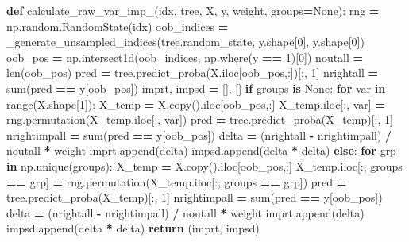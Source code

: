 \documentclass[
  11pt,
  oneside]{book}
\newenvironment{Shaded}{\begin{snugshade}}{\end{snugshade}}
\newcommand{\BuiltInTok}[1]{#1}
\newcommand{\ControlFlowTok}[1]{\textcolor[rgb]{0.13,0.29,0.53}{\textbf{#1}}}
\newcommand{\DecValTok}[1]{\textcolor[rgb]{0.00,0.00,0.81}{#1}}
\newcommand{\KeywordTok}[1]{\textcolor[rgb]{0.13,0.29,0.53}{\textbf{#1}}}
\newcommand{\NormalTok}[1]{#1}
\newcommand{\OperatorTok}[1]{\textcolor[rgb]{0.81,0.36,0.00}{\textbf{#1}}}
\newcommand{\VariableTok}[1]{\textcolor[rgb]{0.00,0.00,0.00}{#1}}
\begin{document}
\begin{Shaded}
\begin{Highlighting}[]
\KeywordTok{def}\NormalTok{ calculate\_raw\_var\_imp\_(idx, tree, X, y, weight, groups}\OperatorTok{=}\VariableTok{None}\NormalTok{):}
\NormalTok{    rng }\OperatorTok{=}\NormalTok{ np.random.RandomState(idx)}
\NormalTok{    oob\_indices }\OperatorTok{=}\NormalTok{ \_generate\_unsampled\_indices(tree.random\_state, y.shape[}\DecValTok{0}\NormalTok{], y.shape[}\DecValTok{0}\NormalTok{])}
\NormalTok{    oob\_pos }\OperatorTok{=}\NormalTok{ np.intersect1d(oob\_indices, np.where(y }\OperatorTok{==} \DecValTok{1}\NormalTok{)[}\DecValTok{0}\NormalTok{])}
\NormalTok{    noutall }\OperatorTok{=} \BuiltInTok{len}\NormalTok{(oob\_pos)}
\NormalTok{    pred }\OperatorTok{=}\NormalTok{ tree.predict\_proba(X.iloc[oob\_pos,:])[:, }\DecValTok{1}\NormalTok{]}
\NormalTok{    nrightall }\OperatorTok{=} \BuiltInTok{sum}\NormalTok{(pred }\OperatorTok{==}\NormalTok{ y[oob\_pos])}
\NormalTok{    imprt, impsd }\OperatorTok{=}\NormalTok{ [], []}
    \ControlFlowTok{if}\NormalTok{ groups }\KeywordTok{is} \VariableTok{None}\NormalTok{:}
        \ControlFlowTok{for}\NormalTok{ var }\KeywordTok{in} \BuiltInTok{range}\NormalTok{(X.shape[}\DecValTok{1}\NormalTok{]):}
\NormalTok{            X\_temp }\OperatorTok{=}\NormalTok{ X.copy().iloc[oob\_pos,:]}
\NormalTok{            X\_temp.iloc[:, var] }\OperatorTok{=}\NormalTok{ rng.permutation(X\_temp.iloc[:, var])}
\NormalTok{            pred }\OperatorTok{=}\NormalTok{ tree.predict\_proba(X\_temp)[:, }\DecValTok{1}\NormalTok{]}
\NormalTok{            nrightimpall }\OperatorTok{=} \BuiltInTok{sum}\NormalTok{(pred }\OperatorTok{==}\NormalTok{ y[oob\_pos])}
\NormalTok{            delta }\OperatorTok{=}\NormalTok{ (nrightall }\OperatorTok{{-}}\NormalTok{ nrightimpall) }\OperatorTok{/}\NormalTok{ noutall }\OperatorTok{*}\NormalTok{ weight}
\NormalTok{            imprt.append(delta)}
\NormalTok{            impsd.append(delta }\OperatorTok{*}\NormalTok{ delta)}
    \ControlFlowTok{else}\NormalTok{:}
        \ControlFlowTok{for}\NormalTok{ grp }\KeywordTok{in}\NormalTok{ np.unique(groups):}
\NormalTok{            X\_temp }\OperatorTok{=}\NormalTok{ X.copy().iloc[oob\_pos,:]}
\NormalTok{            X\_temp.iloc[:, groups }\OperatorTok{==}\NormalTok{ grp] }\OperatorTok{=}\NormalTok{ rng.permutation(X\_temp.iloc[:, groups }\OperatorTok{==}\NormalTok{ grp])}
\NormalTok{            pred }\OperatorTok{=}\NormalTok{ tree.predict\_proba(X\_temp)[:, }\DecValTok{1}\NormalTok{]}
\NormalTok{            nrightimpall }\OperatorTok{=} \BuiltInTok{sum}\NormalTok{(pred }\OperatorTok{==}\NormalTok{ y[oob\_pos])}
\NormalTok{            delta }\OperatorTok{=}\NormalTok{ (nrightall }\OperatorTok{{-}}\NormalTok{ nrightimpall) }\OperatorTok{/}\NormalTok{ noutall }\OperatorTok{*}\NormalTok{ weight}
\NormalTok{            imprt.append(delta)}
\NormalTok{            impsd.append(delta }\OperatorTok{*}\NormalTok{ delta)}
    \ControlFlowTok{return}\NormalTok{ (imprt, impsd)}
  

\end{Highlighting}
\end{Shaded}
\end{document}
